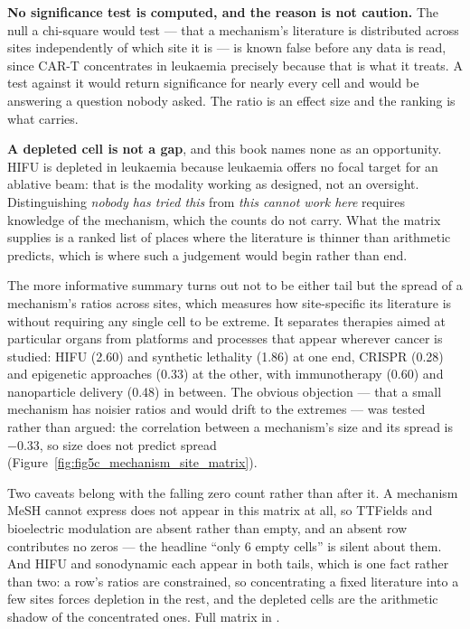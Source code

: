 \documentclass[11pt,twoside,openright]{report}
\begin{document}
\textbf{No significance test is computed, and the reason is not caution.} The null a chi-square would test --- that a mechanism's literature is distributed across sites independently of which site it is --- is known false before any data is read, since CAR-T concentrates in leukaemia precisely because that is what it treats. A test against it would return significance for nearly every cell and would be answering a question nobody asked. The ratio is an effect size and the ranking is what carries.

\textbf{A depleted cell is not a gap}, and this book names none as an opportunity. HIFU is depleted in leukaemia because leukaemia offers no focal target for an ablative beam: that is the modality working as designed, not an oversight. Distinguishing \textit{nobody has tried this} from \textit{this cannot work here} requires knowledge of the mechanism, which the counts do not carry. What the matrix supplies is a ranked list of places where the literature is thinner than arithmetic predicts, which is where such a judgement would begin rather than end.

The more informative summary turns out not to be either tail but the spread of a mechanism's ratios across sites, which measures how site-specific its literature is without requiring any single cell to be extreme. It separates therapies aimed at particular organs from platforms and processes that appear wherever cancer is studied: HIFU (2.60) and synthetic lethality (1.86) at one end, CRISPR (0.28) and epigenetic approaches (0.33) at the other, with immunotherapy (0.60) and nanoparticle delivery (0.48) in between. The obvious objection --- that a small mechanism has noisier ratios and would drift to the extremes --- was tested rather than argued: the correlation between a mechanism's size and its spread is $-$0.33, so size does not predict spread (Figure~\ref{fig:fig5c_mechanism_site_matrix}).

Two caveats belong with the falling zero count rather than after it. A mechanism MeSH cannot express does not appear in this matrix at all, so TTFields and bioelectric modulation are absent rather than empty, and an absent row contributes no zeros --- the headline ``only 6 empty cells'' is silent about them. And HIFU and sonodynamic each appear in both tails, which is one fact rather than two: a row's ratios are constrained, so concentrating a fixed literature into a few sites forces depletion in the rest, and the depleted cells are the arithmetic shadow of the concentrated ones. Full matrix in .
\end{document}
